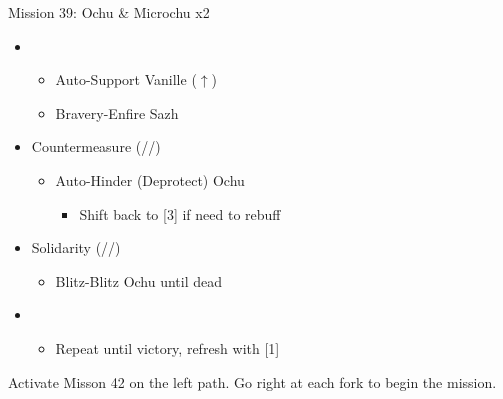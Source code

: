 \renewcommand{\first}{[1] Solidarity (\com/\sen/\med)}
\renewcommand{\second}{[2] Countermeasure (\sab/\sen/\sab)}

\begin{battle}{Mission 39: Ochu \& Microchu x2}
	\begin{itemize}
		\item \third
			\begin{itemize}
				\item Auto-Support Vanille ($\uparrow$)
				\item Bravery-Enfire Sazh
			\end{itemize}
		\item \second
			\begin{itemize}
				\item Auto-Hinder (Deprotect) Ochu
					\begin{itemize}
						\item Shift back to [3] if need to rebuff
					\end{itemize}
			\end{itemize}
		\item \first
			\begin{itemize}
				\item Blitz-Blitz Ochu until dead
			\end{itemize}
		\item \fourth
			\begin{itemize}
				\item Repeat until victory, refresh with [1]
			\end{itemize}												
	\end{itemize}
\end{battle}

Activate Misson 42 on the left path.
Go right at each fork to begin the mission.


